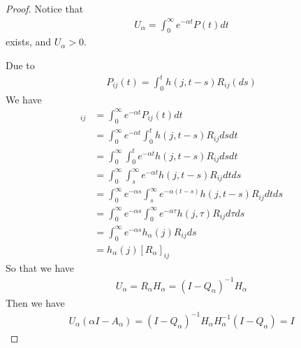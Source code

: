 \documentclass[runningheads]{llncs}
\begin{document}
    \subsection{}
    \begin{proof}
        Notice that 
        \begin{align}
            U_\alpha = \int_0^\infty e^{-\alpha t} P(t)dt
        \end{align} exists, and $U_\alpha > 0$.
        \par
        Due to
        \begin{align}
            P_{ij}(t) = \int_0^t h(j, t - s) R_{ij}(ds)
        \end{align}
        We have
        \begin{align}
            [U_\alpha]_{ij} &= \int_0^\infty e^{-\alpha t} P_{ij}(t)dt \\
            &= \int_0^\infty e^{-\alpha t} \int_0^t h(j, t - s) R_{ij}dsdt \\
            &= \int_0^\infty \int_0^t e^{-\alpha t} h(j, t - s) R_{ij}dsdt \\
            &= \int_0^\infty \int_s^\infty e^{-\alpha t} h(j, t - s) R_{ij}dtds \\
            &= \int_0^\infty e^{-\alpha s} \int_s^\infty e^{-\alpha (t - s)} h(j, t - s) R_{ij}dtds \\
            &= \int_0^\infty e^{-\alpha s} \int_0^\infty e^{-\alpha \tau} h(j, \tau) R_{ij}d\tau ds \\
            &= \int_0^\infty e^{-\alpha s} h_\alpha (j) R_{ij} ds \\
            &= h_\alpha (j) [R_\alpha]_{ij} 
        \end{align}
        So that we have
        \begin{align}
            U_\alpha = R_\alpha H_\alpha = (I - Q_\alpha)^{-1} H_\alpha
        \end{align}
        Then we have
        \begin{align}
            U_\alpha (\alpha I - A_\alpha) = (I - Q_\alpha)^{-1} H_\alpha H_\alpha^{-1}(I - Q_\alpha) = I
        \end{align}
    \end{proof}
\end{document}
